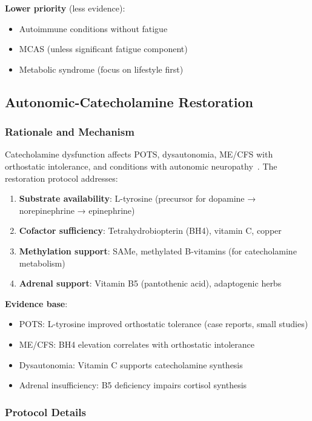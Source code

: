 \textbf{Lower priority} (less evidence):
\begin{itemize}
    \item Autoimmune conditions without fatigue
    \item MCAS (unless significant fatigue component)
    \item Metabolic syndrome (focus on lifestyle first)
\end{itemize}

\subsection{Autonomic-Catecholamine Restoration}
\label{sec:autonomic-restoration}

\subsubsection{Rationale and Mechanism}

Catecholamine dysfunction affects POTS, dysautonomia, ME/CFS with orthostatic intolerance, and conditions with autonomic neuropathy~\cite{VanCampenEtAl2020}. The restoration protocol addresses:

\begin{enumerate}
    \item \textbf{Substrate availability}: L-tyrosine (precursor for dopamine → norepinephrine → epinephrine)
    \item \textbf{Cofactor sufficiency}: Tetrahydrobiopterin (BH4), vitamin C, copper
    \item \textbf{Methylation support}: SAMe, methylated B-vitamins (for catecholamine metabolism)
    \item \textbf{Adrenal support}: Vitamin B5 (pantothenic acid), adaptogenic herbs
\end{enumerate}

\textbf{Evidence base}:
\begin{itemize}
    \item POTS: L-tyrosine improved orthostatic tolerance (case reports, small studies)
    \item ME/CFS: BH4 elevation correlates with orthostatic intolerance~\cite{Bulbule2024}
    \item Dysautonomia: Vitamin C supports catecholamine synthesis~\cite{May1990}
    \item Adrenal insufficiency: B5 deficiency impairs cortisol synthesis
\end{itemize}

\subsubsection{Protocol Details}

